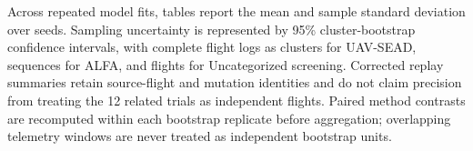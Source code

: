 Across repeated model fits, tables report the mean and sample standard deviation over seeds. Sampling uncertainty is represented by 95\% cluster-bootstrap confidence intervals, with complete flight logs as clusters for UAV-SEAD, sequences for ALFA, and flights for Uncategorized screening. Corrected replay summaries retain source-flight and mutation identities and do not claim precision from treating the 12 related trials as independent flights. Paired method contrasts are recomputed within each bootstrap replicate before aggregation; overlapping telemetry windows are never treated as independent bootstrap units.
